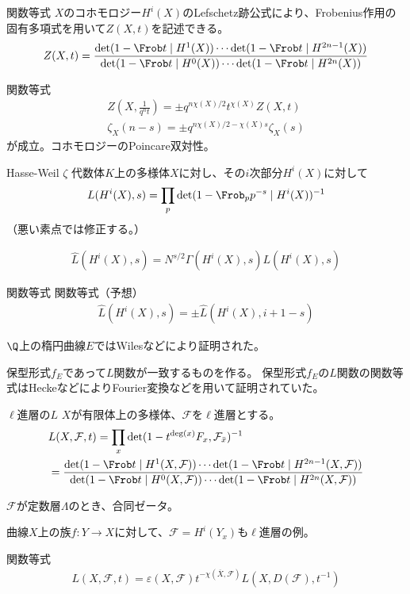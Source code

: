 \documentclass[dvipdfmx]{beamer}
\begin{document}
\begin{frame}{関数等式}
  $X$のコホモロジー$H^i(X)$のLefschetz跡公式により、Frobenius作用の固有多項式を用いて$Z(X,t)$を記述できる。
  \begin{align*}
    Z(X,t)=\frac{\det(1-\Frob t\mid H^1(X))\cdots \det(1-\Frob t\mid H^{2n-1}(X))}
    {\det(1-\Frob t\mid H^0(X))\cdots \det(1-\Frob t\mid H^{2n}(X))}
  \end{align*}
  
  関数等式
  \begin{align*}
    Z(X,\frac{1}{q^nt})=\pm q^{n\chi(X)/2}t^{\chi(X)}Z(X,t)\\
    \zeta_X(n-s)=\pm q^{n\chi(X)/2-\chi(X)s}\zeta_X(s)
  \end{align*}
  が成立。コホモロジーのPoincare双対性。
\end{frame}

\begin{frame}{Hasse-Weil $\zeta$}
  代数体$K$上の多様体$X$に対し、その$i$次部分$H^i(X)$に対して
  \begin{align*}
    L(H^i(X),s)=\prod_p\det(1-\Frob_pp^{-s}\mid H^i(X))^{-1}
  \end{align*}
  （悪い素点では修正する。）

  \begin{align*}
    \hat{L}(H^i(X),s)=N^{s/2}\Gamma(H^i(X),s)L(H^i(X),s)
  \end{align*}
 
\end{frame}

\begin{frame}{関数等式}
  関数等式（予想）
  \begin{align*}
    \hat{L}(H^i(X),s)=\pm\hat{L}(H^i(X),i+1-s)
  \end{align*}
  
  $\Q$上の楕円曲線$E$ではWilesなどにより証明された。
  
  保型形式$f_E$であって$L$関数が一致するものを作る。
  保型形式$f_E$の$L$関数の関数等式はHeckeなどによりFourier変換などを用いて証明されていた。
\end{frame}

\begin{frame}{$\ell$進層の$L$}
  $X$が有限体上の多様体、$\mathcal{F}$を$\ell$進層とする。
  \begin{align*}
    &L(X,\mathcal{F},t)=\prod_x\det(1-t^{\deg(x)}F_x,\mathcal{F}_{\bar{x}})^{-1}\\
    &=\frac{\det(1-\Frob t\mid H^1(X,\mathcal{F}))\cdots \det(1-\Frob t\mid H^{2n-1}(X,\mathcal{F}))}
    {\det(1-\Frob t\mid H^0(X,\mathcal{F}))\cdots \det(1-\Frob t\mid H^{2n}(X,\mathcal{F}))}
  \end{align*}

  $\mathcal{F}$が定数層$\Lambda$のとき、合同ゼータ。

  曲線$X$上の族$f:Y\to X$に対して、$\mathcal{F}=H^i(Y_x)$も$\ell$進層の例。

  関数等式
  \begin{align*}
    L(X,\mathcal{F},t)=\varepsilon(X,\mathcal{F})t^{-\chi(\overline{X},\mathcal{F})}L(X,D(\mathcal{F}),t^{-1})
  \end{align*}
\end{frame}
\end{document}
